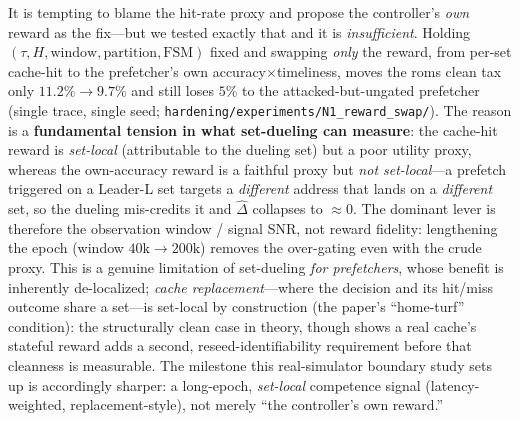 \documentclass{article}
\newcommand{\dhat}{\hat{\Delta}}
\begin{document}
It is tempting to blame the hit-rate proxy and propose the controller's
\emph{own} reward as the fix---but we tested exactly that and it is
\emph{insufficient}. Holding $(\tau,H,\text{window},\text{partition},\text{FSM})$
fixed and swapping \emph{only} the reward, from per-set cache-hit to the
prefetcher's own accuracy$\times$timeliness, moves the roms clean tax only
$11.2\%\!\to\!9.7\%$ and still loses $5\%$ to the attacked-but-ungated prefetcher (single
trace, single seed; \texttt{hardening/experiments/N1\_reward\_swap/}).
The reason is a \textbf{fundamental tension in what set-dueling can measure}: the
cache-hit reward is \emph{set-local} (attributable to the dueling set) but a poor
utility proxy, whereas the own-accuracy reward is a faithful proxy but \emph{not
set-local}---a prefetch triggered on a Leader-L set targets a \emph{different}
address that lands on a \emph{different} set, so the dueling mis-credits it and
$\dhat$ collapses to $\approx\!0$. The dominant lever is therefore the
observation window / signal SNR, not reward fidelity: lengthening the epoch
(window $40\mathrm{k}\!\to\!200\mathrm{k}$) removes the over-gating even with the
crude proxy. This is a genuine limitation of set-dueling \emph{for prefetchers},
whose benefit is inherently de-localized; \emph{cache replacement}---where the
decision and its hit/miss outcome share a set---is set-local by construction (the
paper's ``home-turf'' condition): the structurally clean case in theory, though
 shows a real cache's stateful reward adds a second,
reseed-identifiability requirement before that cleanness is measurable. The milestone
this real-simulator boundary study sets up is accordingly sharper: a long-epoch, \emph{set-local} competence signal
(latency-weighted, replacement-style), not merely ``the controller's own reward.''
\end{document}
